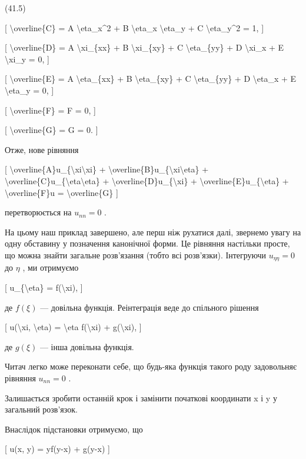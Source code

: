\documentclass[
]{article}
\begin{document}
(41.5)

{[} \textbackslash overline\{C\} = A \textbackslash eta\_x\^{}2 + B
\textbackslash eta\_x \textbackslash eta\_y + C
\textbackslash eta\_y\^{}2 = 1, {]}

{[} \textbackslash overline\{D\} = A \textbackslash xi\_\{xx\} + B
\textbackslash xi\_\{xy\} + C \textbackslash eta\_\{yy\} + D
\textbackslash xi\_x + E \textbackslash xi\_y = 0, {]}

{[} \textbackslash overline\{E\} = A \textbackslash eta\_\{xx\} + B
\textbackslash eta\_\{xy\} + C \textbackslash eta\_\{yy\} + D
\textbackslash eta\_x + E \textbackslash eta\_y = 0, {]}

{[} \textbackslash overline\{F\} = F = 0, {]}

{[} \textbackslash overline\{G\} = G = 0. {]}

Отже, нове рівняння

{[}
\textbackslash overline\{A\}u\_\{\textbackslash xi\textbackslash xi\} +
\textbackslash overline\{B\}u\_\{\textbackslash xi\textbackslash eta\} +
\textbackslash overline\{C\}u\_\{\textbackslash eta\textbackslash eta\}
+ \textbackslash overline\{D\}u\_\{\textbackslash xi\} +
\textbackslash overline\{E\}u\_\{\textbackslash eta\} +
\textbackslash overline\{F\}u = \textbackslash overline\{G\} {]}

перетворюється на \(u_{nn} = 0\) .

На цьому наш приклад завершено, але перш ніж рухатися далі, звернемо
увагу на одну обставину у позначення канонічної форми. Це рівняння
настільки просте, що можна знайти загальне розв'язання (тобто всі
розв'язки). Інтегруючи \(u_{\eta\eta} = 0\) до \(\eta\) , ми отримуємо

{[} u\_\{\textbackslash eta\} = f(\textbackslash xi), {]}

де \(f(\xi)\) --- довільна функція. Реінтеграція веде до спільного
рішення

{[} u(\textbackslash xi, \textbackslash eta) = \textbackslash eta
f(\textbackslash xi) + g(\textbackslash xi), {]}

де \(g(\xi)\) --- інша довільна функція.

Читач легко може переконати себе, що будь-яка функція такого роду
задовольняє рівняння \(u_{nn} = 0\) .

Залишається зробити останній крок і замінити початкові координати x і y
у загальний розв'язок.

Внаслідок підстановки отримуємо, що

{[} u(x, y) = yf(y-x) + g(y-x) {]}
\end{document}
